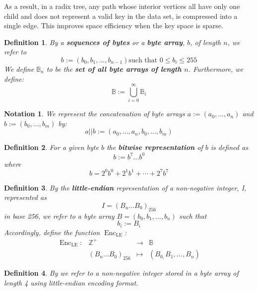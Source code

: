 \documentclass{book}
\newcommand{\assign}{:=}
\newcommand{\tmname}[1]{\textsc{#1}}
\newcommand{\tmop}[1]{\ensuremath{\operatorname{#1}}}
\newcommand{\tmstrong}[1]{\textbf{#1}}
\newcommand{\tmtextbf}[1]{{\bfseries{#1}}}
\newcommand{\tmtextsc}[1]{{\scshape{#1}}}
\newcommand{\tmtexttt}[1]{{\ttfamily{#1}}}
\newcommand{\tmverbatim}[1]{{\ttfamily{#1}}}
\newtheorem{definition}{Definition}
\newtheorem{notation}{Notation}
\providecommand{\tmname}[1]{\tmtextsc{#1}}
\providecommand{\tmop}[1]{\ensuremath{\mathrm{#1}}}
\providecommand{\tmstrong}[1]{\tmtextbf{#1}}
\providecommand{\tmtextbf}[1]{\tmtextbf{#1}}
\providecommand{\tmverbatim}[1]{\tmtexttt{#1}}
\newtheorem{definition}{Definition}
\newtheorem{notation}{Notation}
\begin{document}
As a result, in a radix tree, any path whose interior vertices all have only
one child and does not represent a valid key in the data set, is compressed
into a single edge. This improves space efficiency when the key space is
sparse.

\begin{definition}
  By a {\tmstrong{sequences of bytes}} or a {\tmstrong{byte array}}, $b$, of
  length $n$, we refer to
  \[ b \assign (b_0, b_1, ..., b_{n - 1})  \text{such that } 0 \leqslant b_i
     \leqslant 255 \]
  We define $\mathbb{B}_n$ to be the {\tmstrong{set of all byte arrays of
  length $n$}}. Furthermore, we define:
  \[ \mathbb{B} \assign \bigcup^{\infty}_{i = 0} \mathbb{B}_i \]
\end{definition}

\begin{notation}
  We represent the concatenation of byte arrays $a \assign (a_0, \ldots, a_n)$
  and $b \assign (b_0, \ldots, b_m)$ by:
  \[ a || b \assign (a_0, \ldots, a_n, b_0, \ldots, b_m) \]
\end{notation}

\begin{definition}
  \label{defn-bit-rep}For a given byte $b$ the {\tmstrong{bitwise
  representation}} of $b$ is defined as
  \[ b \assign b^7 \ldots b^0 \]
  where
  \[ b = 2^0 b^0 + 2^1 b^1 + \cdots + 2^7 b^7 \]
\end{definition}

\begin{definition}
  \label{defn-little-endian}By \tmverbatim{}the {\tmstrong{little-endian}}
  representation of a non-negative integer, I, represented as
  \[ I = (B_n \ldots B_0)_{256} \]
  in base 256, we refer to a byte array $B = (b_0, b_1, \ldots, b_n)$ such
  that
  \[ b_i \assign B_i \]
  Accordingly, define the function $\tmop{Enc}_{\tmop{LE}}$:
  \[ \begin{array}{llll}
       \tmop{Enc}_{\tmop{LE}} : & \mathbb{Z}^+ & \rightarrow & \mathbb{B}\\
       & (B_n \ldots B_0)_{256} & \mapsto & (B_{0,} B_1, \ldots_{}, B_n)
     \end{array} \]
  
\end{definition}

\begin{definition}
  By {\tmname{{\tmstrong{\tmverbatim{UINT32}}}}} we refer to a non-negative
  integer stored in a byte array of length 4 using little-endian encoding
  format.
\end{definition}
\end{document}
